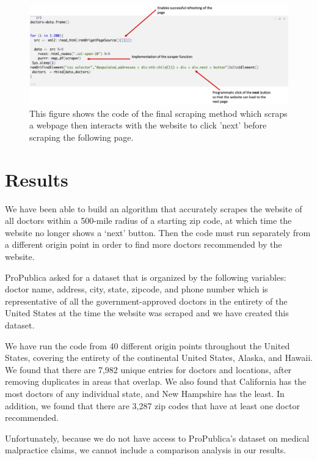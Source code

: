 \documentclass[10pt,letterpaper]{article}
\begin{document}
\begin{figure}
\includegraphics[width=1\linewidth]{final_scrape} \caption{This figure shows the code of the final scraping method which scraps a webpage then interacts with the website to click 'next' before scraping the following page.}\label{fig:unnamed-chunk-4}
\end{figure}

\hypertarget{results}{%
\section{Results}\label{results}}

We have been able to build an algorithm that accurately scrapes the
website of all doctors within a 500-mile radius of a starting zip code,
at which time the website no longer shows a `next' button. Then the code
must run separately from a different origin point in order to find more
doctors recommended by the website.

ProPublica asked for a dataset that is organized by the following
variables: doctor name, address, city, state, zipcode, and phone number
which is representative of all the government-approved doctors in the
entirety of the United States at the time the website was scraped and we
have created this dataset.

We have run the code from 40 different origin points throughout the
United States, covering the entirety of the continental United States,
Alaska, and Hawaii. We found that there are 7,982 unique entries for
doctors and locations, after removing duplicates in areas that overlap.
We also found that California has the most doctors of any individual
state, and New Hampshire has the least. In addition, we found that there
are 3,287 zip codes that have at least one doctor recommended.

Unfortunately, because we do not have access to ProPublica's dataset on
medical malpractice claims, we cannot include a comparison analysis in
our results.
\end{document}
